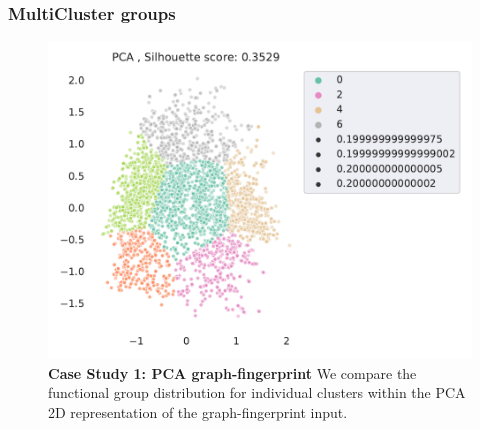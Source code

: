 \subsubsection{MultiCluster groups}







\begin{figure}[H]
    \centering
    \includegraphics[width=\textwidth]{outputs/PCA/fingerprints_all.pdf}
    \caption{\textbf{Case Study 1: PCA graph-fingerprint} We compare the functional group distribution for individual clusters within the PCA 2D representation of the graph-fingerprint input.}
    \label{fig:pcagraphcase}
\end{figure}


